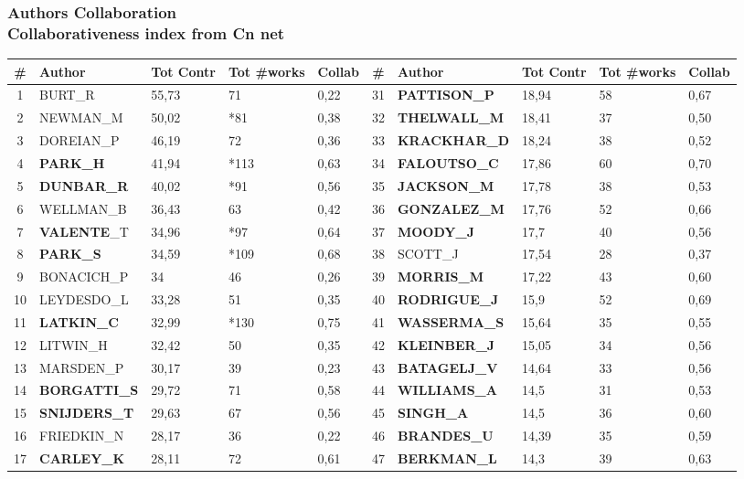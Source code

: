 \documentclass[hyperref={pdfstartview={FitBH -32768},
                         pdfpagemode=FullScreen,
                         plainpages=false,
                         colorlinks=true}
              ]{beamer}
\begin{document}
\begin{frame}[fragile]
\frametitle{Authors Collaboration \\ \normalsize Collaborativeness index from Cn net}

\renewcommand{\arraystretch}{0.82}
\tiny
\begin{tabular}{c|l|p{0.4cm}|p{0.6cm}|p{0.4cm}||c|l|p{0.4cm}|p{0.6cm}|p{0.4cm}|} 
\# & Author & Tot Contr & Tot \#works & Collab & \# & Author & Tot Contr & Tot \#works & Collab \\ \hline
1& 	BURT\_R& 	55,73& 	71& 	0,22& 	31& 	\textbf{PATTISON\_P}& 	18,94& 	58& 	0,67\\
2& 	NEWMAN\_M& 	50,02& 	*81& 	0,38& 	32& 	\textbf{THELWALL\_M}& 	18,41& 	37& 	0,50\\
3& 	DOREIAN\_P& 	46,19& 	72& 	0,36& 	33& 	\textbf{KRACKHAR\_D}& 	18,24& 	38& 	0,52\\
4& 	\textbf{PARK\_H}& 	41,94& 	*113& 	0,63& 	34& 	\textbf{FALOUTSO\_C}& 	17,86& 	60& 	0,70\\
5& 	\textbf{DUNBAR\_R}& 	40,02& 	*91& 	0,56& 	35& 	\textbf{JACKSON\_M}& 	17,78& 	38& 	0,53\\
6& 	WELLMAN\_B& 	36,43& 	63& 	0,42& 	36& 	\textbf{GONZALEZ\_M}& 	17,76& 	52& 	0,66\\
7& 	\textbf{VALENTE}\_T& 	34,96& 	*97& 	0,64& 	37& 	\textbf{MOODY\_J}& 	17,7& 	40& 	0,56\\
8& 	\textbf{PARK\_S}& 	34,59& 	*109& 	0,68& 	38& 	SCOTT\_J& 	17,54& 	28& 	0,37\\
9& 	BONACICH\_P& 	34& 	46& 	0,26& 	39& 	\textbf{MORRIS\_M}& 	17,22& 	43& 	0,60\\
10& 	LEYDESDO\_L& 	33,28& 	51& 	0,35& 	40& 	\textbf{RODRIGUE\_J}& 	15,9& 	52& 	0,69\\
11& 	\textbf{LATKIN\_C}& 	32,99& 	*130& 	0,75& 	41& 	\textbf{WASSERMA\_S}& 	15,64& 	35& 	0,55\\
12& 	LITWIN\_H& 	32,42& 	50& 	0,35& 	42& 	\textbf{KLEINBER\_J}& 	15,05& 	34& 	0,56\\
13& 	MARSDEN\_P& 	30,17& 	39& 	0,23& 	43& 	\textbf{BATAGELJ\_V}& 	14,64& 	33& 	0,56\\
14& 	\textbf{BORGATTI\_S}& 	29,72& 	71& 	0,58& 	44& 	\textbf{WILLIAMS\_A}& 	14,5& 	31& 	0,53\\
15& 	\textbf{SNIJDERS\_T}& 	29,63& 	67& 	0,56& 	45& 	\textbf{SINGH\_A}& 	14,5& 	36& 	0,60\\
16& 	FRIEDKIN\_N& 	28,17& 	36& 	0,22& 	46& 	\textbf{BRANDES\_U}& 	14,39& 	35& 	0,59\\
17& 	\textbf{CARLEY\_K}& 	28,11& 	72& 	0,61& 	47& 	\textbf{BERKMAN\_L}& 	14,3& 	39& 	0,63\\

\end{tabular}
\end{frame}
\end{document}
